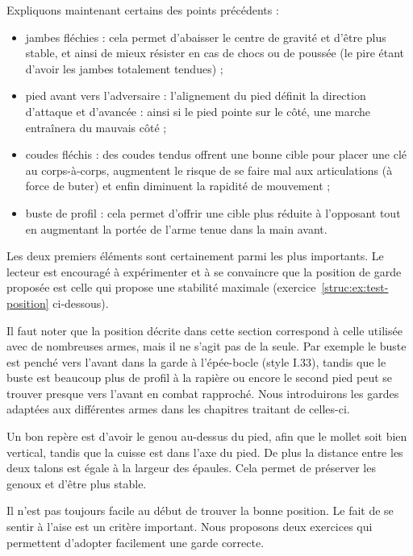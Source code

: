 \noindent
Expliquons maintenant certains des points précédents :
\begin{itemize}
	\item jambes fléchies : cela permet d'abaisser le centre de gravité et d'être plus stable, et ainsi de mieux résister en cas de chocs ou de poussée (le pire étant d'avoir les jambes totalement tendues) ;
	
	\item pied avant vers l'adversaire : l'alignement du pied définit la direction d'attaque et d'avancée : ainsi si le pied pointe sur le côté, une marche entraînera du mauvais côté ;
	
	\item coudes fléchis : des coudes tendus offrent une bonne cible pour placer une clé au corps-à-corps, augmentent le risque de se faire mal aux articulations (à force de buter) et enfin diminuent la rapidité de mouvement ;
	
	\item buste de profil : cela permet d'offrir une cible plus réduite à l'opposant tout en augmentant la portée de l'arme tenue dans la main avant.
\end{itemize}
Les deux premiers éléments sont certainement parmi les plus importants.
Le lecteur est encouragé à expérimenter et à se convaincre que la position de garde proposée est celle qui propose une stabilité maximale (exercice~\ref{struc:ex:test-position} ci-dessous).

Il faut noter que la position décrite dans cette section correspond à celle utilisée avec de nombreuses armes, mais il ne s'agit pas de la seule.
Par exemple le buste est penché vers l'avant dans la garde à l'épée-bocle (style I.33), tandis que le buste est beaucoup plus de profil à la rapière ou encore le second pied peut se trouver presque vers l'avant en combat rapproché.
Nous introduirons les gardes adaptées aux différentes armes dans les chapitres traitant de celles-ci.

Un bon repère est d'avoir le genou au-dessus du pied, afin que le mollet soit bien vertical, tandis que la cuisse est dans l'axe du pied.
De plus la distance entre les deux talons est égale à la largeur des épaules.
Cela permet de préserver les genoux et d'être plus stable.

Il n'est pas toujours facile au début de trouver la bonne position.
Le fait de se sentir à l'aise est un critère important.
Nous proposons deux exercices qui permettent d'adopter facilement une garde correcte.


